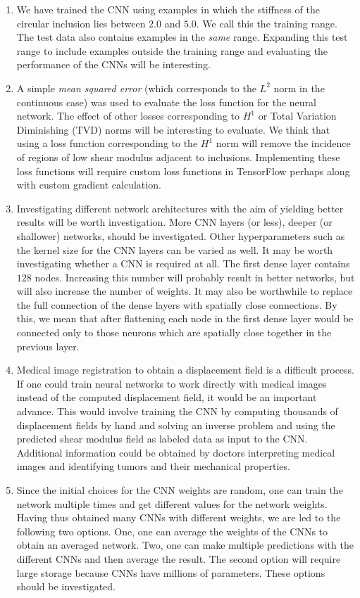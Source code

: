 \documentclass[12pt]{article}
\begin{document}
\begin{enumerate}
\item{We have trained the CNN using examples in which the stiffness of the circular inclusion lies between $2.0$ and $5.0$. We call this the training range. The test data also contains examples in the \textit{same} range. Expanding this test range to include examples outside the training range and evaluating the performance of the CNNs will be interesting.}
\item{A simple \textit{mean squared error} (which corresponds to the $L^2$ norm in the continuous case) was used to evaluate the loss function for the neural network. The effect of other losses corresponding to $H^1$ or Total Variation Diminishing (TVD) norms will be interesting to evaluate. We think that using a loss function corresponding to the $H^1$ norm will remove the incidence of regions of low shear modulus adjacent to inclusions. Implementing these loss functions will require custom loss functions in TensorFlow perhaps along with custom gradient calculation.}
\item{Investigating different network architectures with the aim of yielding better results will be worth investigation. More CNN layers (or less), deeper (or shallower) networks, should be investigated. Other hyperparameters such as the kernel size for the CNN layers can be varied as well. It may be worth investigating whether a CNN is required at all. The first dense layer contains $128$ nodes. Increasing this number will probably result in better networks, but will also increase the number of weights. It may also be worthwhile to replace the full connection of the dense layers with spatially close connections. By this, we mean that after flattening each node in the first dense layer would be connected only to those neurons which are spatially close together in the previous layer.}
\item{Medical image registration to obtain a displacement field is a difficult process. If one could train neural networks to work directly with medical images instead of the computed displacement field, it would be an important advance. This would involve training the CNN by computing thousands of displacement fields by hand and solving an inverse problem and using the predicted shear modulus field as labeled data as input to the CNN. Additional information could be obtained by doctors interpreting medical images and identifying tumors and their mechanical properties.}
\item{Since the initial choices for the CNN weights are random, one can train the network multiple times and get different values for the network weights. Having thus obtained many CNNs with different weights, we are led to the following two options. One, one can average the weights of the CNNs to obtain an averaged network. Two, one can make multiple predictions with the different CNNs and then average the result. The second option will require large storage because CNNs have millions of parameters. These options should be investigated.}

\end{enumerate}
\end{document}
